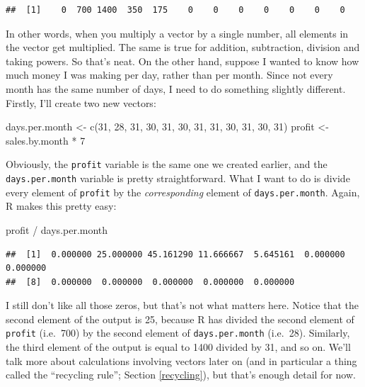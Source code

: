 \documentclass[
]{book}
\newenvironment{Shaded}{\begin{snugshade}}{\end{snugshade}}
\newcommand{\DecValTok}[1]{\textcolor[rgb]{0.00,0.00,0.81}{#1}}
\newcommand{\FunctionTok}[1]{\textcolor[rgb]{0.00,0.00,0.00}{#1}}
\newcommand{\NormalTok}[1]{#1}
\newcommand{\OtherTok}[1]{\textcolor[rgb]{0.56,0.35,0.01}{#1}}
\newcommand{\SpecialCharTok}[1]{\textcolor[rgb]{0.00,0.00,0.00}{#1}}
\begin{document}
\begin{verbatim}
##  [1]    0  700 1400  350  175    0    0    0    0    0    0    0
\end{verbatim}

In other words, when you multiply a vector by a single number, all elements in the vector get multiplied. The same is true for addition, subtraction, division and taking powers. So that's neat. On the other hand, suppose I wanted to know how much money I was making per day, rather than per month. Since not every month has the same number of days, I need to do something slightly different. Firstly, I'll create two new vectors:

\begin{Shaded}
\begin{Highlighting}[]
\NormalTok{days.per.month }\OtherTok{\textless{}{-}} \FunctionTok{c}\NormalTok{(}\DecValTok{31}\NormalTok{, }\DecValTok{28}\NormalTok{, }\DecValTok{31}\NormalTok{, }\DecValTok{30}\NormalTok{, }\DecValTok{31}\NormalTok{, }\DecValTok{30}\NormalTok{, }\DecValTok{31}\NormalTok{, }\DecValTok{31}\NormalTok{, }\DecValTok{30}\NormalTok{, }\DecValTok{31}\NormalTok{, }\DecValTok{30}\NormalTok{, }\DecValTok{31}\NormalTok{)}
\NormalTok{profit }\OtherTok{\textless{}{-}}\NormalTok{ sales.by.month }\SpecialCharTok{*} \DecValTok{7}
\end{Highlighting}
\end{Shaded}

Obviously, the \texttt{profit} variable is the same one we created earlier, and the \texttt{days.per.month} variable is pretty straightforward. What I want to do is divide every element of \texttt{profit} by the \emph{corresponding} element of \texttt{days.per.month}. Again, R makes this pretty easy:

\begin{Shaded}
\begin{Highlighting}[]
\NormalTok{profit }\SpecialCharTok{/}\NormalTok{ days.per.month}
\end{Highlighting}
\end{Shaded}

\begin{verbatim}
##  [1]  0.000000 25.000000 45.161290 11.666667  5.645161  0.000000  0.000000
##  [8]  0.000000  0.000000  0.000000  0.000000  0.000000
\end{verbatim}

I still don't like all those zeros, but that's not what matters here. Notice that the second element of the output is 25, because R has divided the second element of \texttt{profit} (i.e.~700) by the second element of \texttt{days.per.month} (i.e.~28). Similarly, the third element of the output is equal to 1400 divided by 31, and so on. We'll talk more about calculations involving vectors later on (and in particular a thing called the ``recycling rule''; Section \ref{recycling}), but that's enough detail for now.
\end{document}
